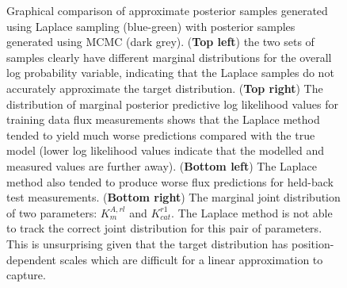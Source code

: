 \documentclass[journal=asbcd6,manuscript=article,layout=traditional]{achemso}
\begin{document}
\begin{figure}

\begin{minipage}[t]{\linewidth}

{\centering 


}

\end{minipage}%

\caption{\label{fig-laplace}Graphical comparison of approximate
posterior samples generated using Laplace sampling (blue-green) with
posterior samples generated using MCMC (dark grey). (\textbf{Top left})
the two sets of samples clearly have different marginal distributions
for the overall log probability variable, indicating that the Laplace
samples do not accurately approximate the target distribution.
(\textbf{Top right}) The distribution of marginal posterior predictive
log likelihood values for training data flux measurements shows that the
Laplace method tended to yield much worse predictions compared with the
true model (lower log likelihood values indicate that the modelled and
measured values are further away). (\textbf{Bottom left}) The Laplace
method also tended to produce worse flux predictions for held-back test
measurements. (\textbf{Bottom right}) The marginal joint distribution of
two parameters: \(K_m^{A,rl}\) and \(K_{cat}^{r1}\). The Laplace method
is not able to track the correct joint distribution for this pair of
parameters. This is unsurprising given that the target distribution has
position-dependent scales which are difficult for a linear approximation
to capture.}

\end{figure}
\end{document}
